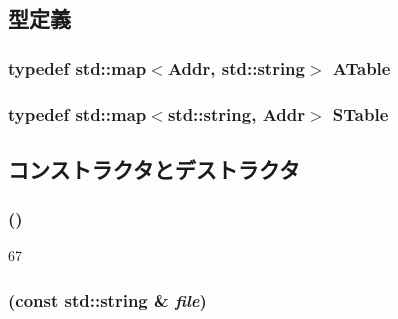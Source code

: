 \subsection{型定義}
\hypertarget{classSymbolTable_a774a5b092c28960e65c8301f26a0bf88}{
\subsubsection[{ATable}]{\setlength{\rightskip}{0pt plus 5cm}typedef std::map$<${\bf Addr}, std::string$>$ {\bf ATable}}}
\label{classSymbolTable_a774a5b092c28960e65c8301f26a0bf88}
\hypertarget{classSymbolTable_ad1bd5f7577278d0dd7a1b10fe53e8d9e}{
\subsubsection[{STable}]{\setlength{\rightskip}{0pt plus 5cm}typedef std::map$<$std::string, {\bf Addr}$>$ {\bf STable}}}
\label{classSymbolTable_ad1bd5f7577278d0dd7a1b10fe53e8d9e}


\subsection{コンストラクタとデストラクタ}
\hypertarget{classSymbolTable_a8b1c95b7c6fcc42a2755109c007522df}{
\subsubsection[{SymbolTable}]{ ()}}
\label{classSymbolTable_a8b1c95b7c6fcc42a2755109c007522df}



\begin{DoxyCode}
67 {}
\end{DoxyCode}
\hypertarget{classSymbolTable_ae77cee612a9d2a6f7a551a160d2881b3}{
\subsubsection[{SymbolTable}]{ (const std::string \& {\em file})}}
\label{classSymbolTable_ae77cee612a9d2a6f7a551a160d2881b3}



